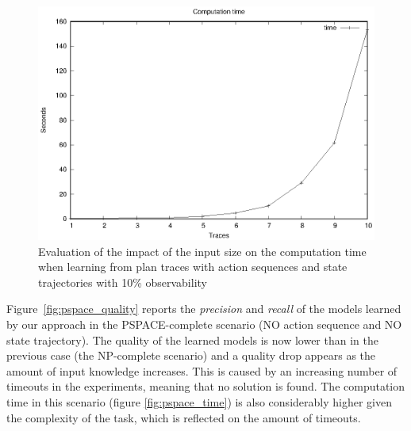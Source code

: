\begin{figure}[hbt!]
	\centering
	\includegraphics[width=0.8\linewidth]{figures/input_size_100_10_time.eps}
	\caption{Evaluation of the impact of the input size on the computation time when learning from plan traces with \FO action sequences and \PO state trajectories with 10\% observability}
	\label{fig:np_time}
\end{figure}


\newpage
Figure~\ref{fig:pspace_quality} reports the {\em precision} and {\em recall} of the models learned by our approach in the PSPACE-complete scenario (NO action sequence and NO state trajectory). The quality of the learned models is now lower than in the previous case (the NP-complete scenario) and a quality drop appears as the amount of input knowledge increases. This is caused by an increasing number of timeouts in the experiments, meaning that no solution is found. The computation time in this scenario (figure \ref{fig:pspace_time}) is also considerably higher given the complexity of the task, which is reflected on the amount of timeouts.


